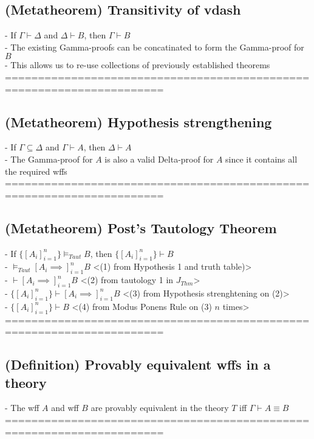 \documentclass{article}
\begin{document}
\subsection{(Metatheorem) Transitivity of vdash}
	- If $\Gamma \vdash \Delta$ and $\Delta \vdash B$, then $\Gamma \vdash B$ \\
	- The existing Gamma-proofs can be concatinated to form the Gamma-proof for $B$ \\
	- This allows us to re-use collections of previously established theorems \\
	======================================================================
\subsection{(Metatheorem) Hypothesis strengthening}
	- If $\Gamma \subseteq \Delta$ and $\Gamma \vdash A$, then $\Delta \vdash A$ \\
	- The Gamma-proof for $A$ is also a valid Delta-proof for $A$ since it contains all the required wffs \\
	======================================================================
\subsection{(Metatheorem) Post's Tautology Theorem}
	- If $\{[A_i]_{i=1}^n\} \vDash_{Taut} B$, then $\{[A_i]_{i=1}^n\} \vdash B$ \\
	- $\vDash_{Taut} [A_i \implies]_{i=1}^n B$ <(1) from Hypothesis 1 and truth table)> \\
	- $\vdash [A_i \implies]_{i=1}^n B$ <(2) from tautology 1 in $J_{Thm}$> \\
	- $\{[A_i]_{i=1}^n\} \vdash [A_i \implies]_{i=1}^n B$ <(3) from Hypothesis strenghtening on (2)>\\
	- $\{[A_i]_{i=1}^n\} \vdash B$ <(4) from Modus Ponens Rule on (3) $n$ times>
	======================================================================
\subsection{(Definition) Provably equivalent wffs in a theory}
	- The wff $A$ and wff $B$ are provably equivalent in the theory $T$ iff $\Gamma \vdash A \equiv B$
	======================================================================
\end{document}
